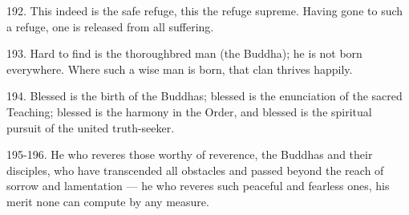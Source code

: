 192. This indeed is the safe refuge, this the refuge supreme. Having gone to such a refuge, one is released from all suffering.

193. Hard to find is the thoroughbred man (the Buddha); he is not born everywhere. Where such a wise man is born, that clan thrives happily.

194. Blessed is the birth of the Buddhas; blessed is the enunciation of the sacred Teaching; blessed is the harmony in the Order, and blessed is the spiritual pursuit of the united truth-seeker.

195-196. He who reveres those worthy of reverence, the Buddhas and their disciples, who have transcended all obstacles and passed beyond the reach of sorrow and lamentation — he who reveres such peaceful and fearless ones, his merit none can compute by any measure.
